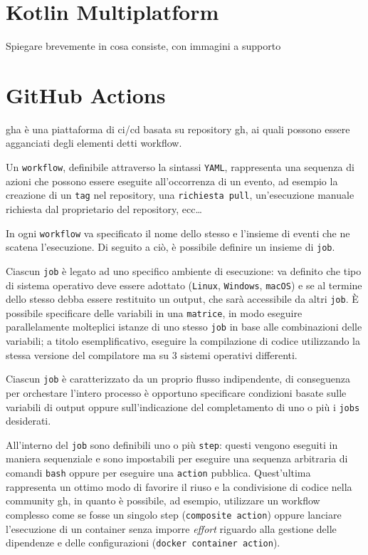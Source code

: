 \documentclass[12pt,a4paper,openright,twoside]{book}
\begin{document}
\section{Kotlin Multiplatform}
Spiegare brevemente in cosa consiste, con immagini a supporto

\section{GitHub Actions}
 \ac{gha} è una piattaforma di \ac{ci}/\ac{cd} basata su repository \ac{gh},
 ai quali possono essere agganciati degli elementi detti workflow.

 Un \texttt{workflow}, definibile attraverso la sintassi \texttt{YAML}, rappresenta una sequenza di azioni che possono essere eseguite
 all'occorrenza di un evento, ad esempio la creazione di un \texttt{tag} nel repository,
 una \texttt{richiesta pull}, un'esecuzione manuale richiesta dal proprietario del repository, ecc\dots

In ogni \texttt{workflow} va specificato il nome dello stesso e l'insieme di eventi che ne scatena 
l'esecuzione. 
Di seguito a ciò, è possibile definire un insieme di \texttt{job}.

Ciascun \texttt{job} è legato ad uno specifico ambiente di esecuzione: va definito che tipo di
sistema operativo deve essere adottato (\texttt{Linux}, \texttt{Windows}, \texttt{macOS})
e se al termine dello stesso debba essere restituito un output, che sarà accessibile da altri \texttt{job}.
È possibile specificare delle variabili in una \texttt{matrice}, in modo eseguire parallelamente molteplici istanze di uno stesso \texttt{job} 
in base alle combinazioni delle variabili; a titolo esemplificativo, eseguire la compilazione di codice utilizzando
la stessa versione del compilatore ma su 3 sistemi operativi differenti.  

Ciascun \texttt{job} è caratterizzato da un proprio flusso indipendente, di conseguenza
per orchestare l'intero processo è opportuno specificare condizioni basate sulle variabili di output 
oppure sull'indicazione del completamento di uno o più i \texttt{jobs} desiderati.

All'interno del \texttt{job} sono definibili uno o più \texttt{step}: questi vengono eseguiti in maniera sequenziale
e sono impostabili per eseguire una sequenza arbitraria di comandi \texttt{bash} oppure
per eseguire una \texttt{action} pubblica.
Quest'ultima rappresenta un ottimo modo di favorire il riuso
e la condivisione di codice nella community \ac{gh}, in quanto è possibile, ad esempio, utilizzare un workflow complesso
come se fosse un singolo step (\texttt{composite action}) oppure lanciare l'esecuzione di un container senza
imporre \textit{effort} riguardo alla gestione delle dipendenze e delle configurazioni (\texttt{docker container action}).
\end{document}
